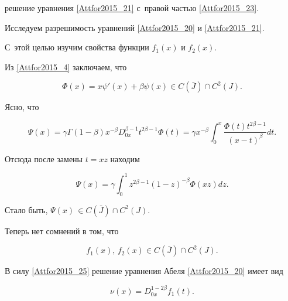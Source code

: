 решение уравнения \eqref{Attfor2015_21} с~правой частью  \rm \eqref{Attfor2015_23}.





\rm 

\smallskip





Исследуем разрешимость уравнений \eqref{Attfor2015_20} и  \eqref{Attfor2015_21}. 

С~этой целью изучим свойства функции  $f_1(x)$ и $f_2(x)$.



Из \eqref{Attfor2015_4} заключаем, что 

\begin{equation}

\label{Attfor2015_24}

\Phi(x)=x\psi'(x)+\beta\psi(x) \in C(\bar{J})\cap C^2(J).

\end{equation}

Ясно, что

$$

\Psi(x)=\gamma\Gamma(1-\beta)x^{-\beta}D_{0x}^{\beta-1}

t^{2\beta-1}\Phi(t)=\gamma x^{-\beta} \int _0^x

\frac{\Phi(t)t^{2\beta-1}}{(x-t)^\beta} dt.

$$

Отсюда после замены $t=xz$ находим

\begin{equation}

\label{Attfor2015_25}

\Psi(x)=\gamma \int _0^1 z^{2\beta-1}(1-z)^{-\beta}\Phi(xz)dz.

\end{equation}

Стало быть, $\Psi(x)\,\in C(\bar{J})\cap C^2(J)$. 

Теперь нет сомнений в том, что 

\begin{equation}

\label{Attfor2015_26}

f_1(x), \, f_2(x)\in C(\bar{J})\cap C^2(J).

\end{equation}

В силу \eqref{Attfor2015_25} решение уравнения Абеля \eqref{Attfor2015_20} имеет вид

\begin{equation}

\label{Attfor2015_27}

\nu(x)=D_{0x}^{1-2\beta}f_1(t).

\end{equation}

